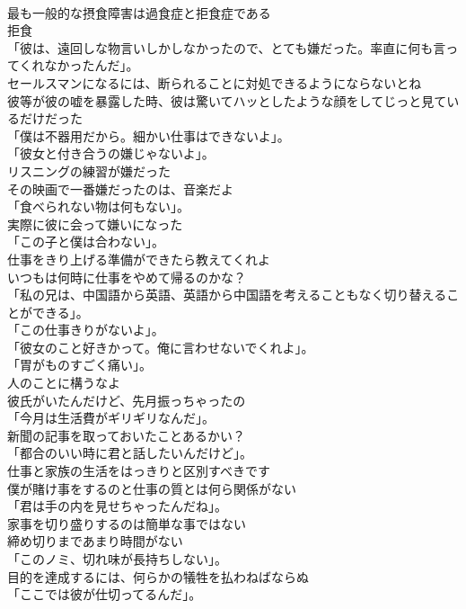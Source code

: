 \documentclass[8pt]{extreport}
\begin{document}
\begin{CJK}{UTF8}{min}
\\	最も一般的な摂食障害は過食症と拒食症である	
\\	拒食
\\	「彼は、遠回しな物言いしかしなかったので、とても嫌だった。率直に何も言ってくれなかったんだ」。	
\\	セールスマンになるには、断られることに対処できるようにならないとね	
\\	彼等が彼の嘘を暴露した時、彼は驚いてハッとしたような顔をしてじっと見ているだけだった	
\\	「僕は不器用だから。細かい仕事はできないよ」。	
\\	「彼女と付き合うの嫌じゃないよ」。	
\\	リスニングの練習が嫌だった	
\\	その映画で一番嫌だったのは、音楽だよ	
\\	「食べられない物は何もない」。	
\\	実際に彼に会って嫌いになった	
\\	「この子と僕は合わない」。	
\\	仕事をきり上げる準備ができたら教えてくれよ	
\\	いつもは何時に仕事をやめて帰るのかな？	
\\	「私の兄は、中国語から英語、英語から中国語を考えることもなく切り替えることができる」。	
\\	「この仕事きりがないよ」。	
\\	「彼女のこと好きかって。俺に言わせないでくれよ」。	
\\	「胃がものすごく痛い」。	
\\	人のことに構うなよ	
\\	彼氏がいたんだけど、先月振っちゃったの	
\\	「今月は生活費がギリギリなんだ」。	
\\	新聞の記事を取っておいたことあるかい？	
\\	「都合のいい時に君と話したいんだけど」。	
\\	仕事と家族の生活をはっきりと区別すべきです	
\\	僕が賭け事をするのと仕事の質とは何ら関係がない	
\\	「君は手の内を見せちゃったんだね」。	
\\	家事を切り盛りするのは簡単な事ではない	
\\	締め切りまであまり時間がない	
\\	「このノミ、切れ味が長持ちしない」。	
\\	目的を達成するには、何らかの犠牲を払わねばならぬ	
\\	「ここでは彼が仕切ってるんだ」。	

\end{CJK}
\end{document}

